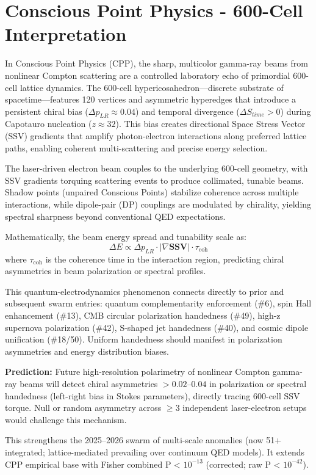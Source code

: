 \documentclass[11pt]{article}
\begin{document}
\section{Conscious Point Physics - 600-Cell Interpretation}
In Conscious Point Physics (CPP), the sharp, multicolor gamma-ray beams from nonlinear Compton scattering are a controlled laboratory echo of primordial 600-cell lattice dynamics. The 600-cell hypericosahedron—discrete substrate of spacetime—features 120 vertices and asymmetric hyperedges that introduce a persistent chiral bias ($\Delta p_{LR} \approx 0.04$) and temporal divergence ($\Delta S_{time} > 0$) during Capotauro nucleation ($z \approx 32$). This bias creates directional Space Stress Vector (SSV) gradients that amplify photon-electron interactions along preferred lattice paths, enabling coherent multi-scattering and precise energy selection.

The laser-driven electron beam couples to the underlying 600-cell geometry, with SSV gradients torquing scattering events to produce collimated, tunable beams. Shadow points (unpaired Conscious Points) stabilize coherence across multiple interactions, while dipole-pair (DP) couplings are modulated by chirality, yielding spectral sharpness beyond conventional QED expectations.

Mathematically, the beam energy spread and tunability scale as:  
\[
\Delta E \propto \Delta p_{LR} \cdot |\nabla \mathbf{SSV}| \cdot \tau_{\text{coh}}
\]  
where $\tau_{\text{coh}}$ is the coherence time in the interaction region, predicting chiral asymmetries in beam polarization or spectral profiles.

This quantum-electrodynamics phenomenon connects directly to prior and subsequent swarm entries: quantum complementarity enforcement (\#6), spin Hall enhancement (\#13), CMB circular polarization handedness (\#49), high-z supernova polarization (\#42), S-shaped jet handedness (\#40), and cosmic dipole unification (\#18/50). Uniform handedness should manifest in polarization asymmetries and energy distribution biases.

\textbf{Prediction:} Future high-resolution polarimetry of nonlinear Compton gamma-ray beams will detect chiral asymmetries $> 0.02$--$0.04$ in polarization or spectral handedness (left-right bias in Stokes parameters), directly tracing 600-cell SSV torque. Null or random asymmetry across $\geq 3$ independent laser-electron setups would challenge this mechanism.

This strengthens the 2025--2026 swarm of multi-scale anomalies (now 51+ integrated; lattice-mediated prevailing over continuum QED models). It extends CPP empirical base with Fisher combined P < $10^{-13}$ (corrected; raw P < $10^{-42}$).
\end{document}

